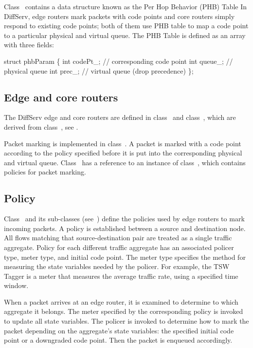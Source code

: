 Class~ contains a data structure known as 
  the Per Hop Behavior (PHB) Table 
In DiffServ, edge routers mark packets with code points and 
  core routers simply respond to existing code points;
  both of them use PHB table to map a code point to 
  a particular physical and virtual queue.
The PHB Table is defined as an array with three fields:

\begin{program}
struct phbParam \{
   int codePt_; // corresponding code point
   int queue_;	// physical queue
   int prec_;	// virtual queue (drop precedence)
\};
\end{program}


\subsection{Edge and core routers}
\label{sec:dsedge}
The DiffServ edge and core routers are defined in 
  class~ and class~, 
  which are derived from class~,
  see . 

Packet marking is implemented in class~.
A packet is marked with a code point according to 
  the policy specified
  before it is put into the corresponding physical and virtual queue.
Class~ has a reference to an instance of 
  class~,
  which contains policies for packet marking.

\subsection{Policy}
\label{sec:dspolicy}
Class~ and its sub-classes (see~) 
  define the policies used by edge routers to mark incoming packets.
A policy is established between a source and destination node.  
All flows matching that source-destination pair are 
  treated as a single traffic aggregate.
Policy for each different traffic aggregate has 
  an associated policer type, meter type, and initial code point.  
The meter type specifies the method for measuring the state variables 
  needed by the policer.  
For example, 
  the TSW Tagger is a meter that measures the average traffic rate, 
  using a specified time window.

When a packet arrives at an edge router, 
  it is examined to determine to which aggregate it belongs.  
The meter specified by the corresponding policy is invoked to 
  update all state variables.  
The policer is invoked to determine how to mark the packet
  depending on the aggregate's state variables:
  the specified initial code point or 
  a downgraded code point.
Then the packet is enqueued accordingly.

